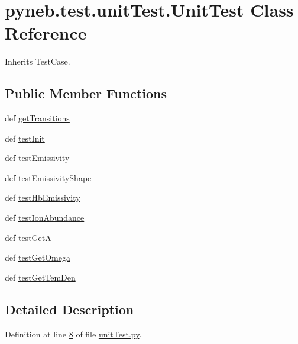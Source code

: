 \hypertarget{classpyneb_1_1test_1_1unit_test_1_1_unit_test}{\section{pyneb.\-test.\-unit\-Test.\-Unit\-Test Class Reference}
\label{classpyneb_1_1test_1_1unit_test_1_1_unit_test}
}


Inherits Test\-Case.

\subsection*{Public Member Functions}
\begin{DoxyCompactItemize}
\item 
def \hyperlink{classpyneb_1_1test_1_1unit_test_1_1_unit_test_a3537bc36150d7be4c29ce457d7516056}{get\-Transitions}
\item 
def \hyperlink{classpyneb_1_1test_1_1unit_test_1_1_unit_test_ac77797fa5bbeb259cf0c9e29ea02cf0b}{test\-Init}
\item 
def \hyperlink{classpyneb_1_1test_1_1unit_test_1_1_unit_test_aaf8316a5619d701aaae56fdd26dd167b}{test\-Emissivity}
\item 
def \hyperlink{classpyneb_1_1test_1_1unit_test_1_1_unit_test_ab20c505e3d6c94360bcf1bf5cdd4278d}{test\-Emissivity\-Shape}
\item 
def \hyperlink{classpyneb_1_1test_1_1unit_test_1_1_unit_test_a2f991eb62fa070893eacc36ce1879004}{test\-Hb\-Emissivity}
\item 
def \hyperlink{classpyneb_1_1test_1_1unit_test_1_1_unit_test_a7a316a645d962527433b1e5b4de4f5ce}{test\-Ion\-Abundance}
\item 
def \hyperlink{classpyneb_1_1test_1_1unit_test_1_1_unit_test_a2aacf1ea25a476599f1e7cf83de571b2}{test\-Get\-A}
\item 
def \hyperlink{classpyneb_1_1test_1_1unit_test_1_1_unit_test_a75cb0860a7a06b129a1028ca635eacf6}{test\-Get\-Omega}
\item 
def \hyperlink{classpyneb_1_1test_1_1unit_test_1_1_unit_test_a8340dae4a77382c9c82c1ce67209d47a}{test\-Get\-Tem\-Den}
\end{DoxyCompactItemize}


\subsection{Detailed Description}


Definition at line \hyperlink{unit_test_8py_source_l00008}{8} of file \hyperlink{unit_test_8py_source}{unit\-Test.\-py}.



